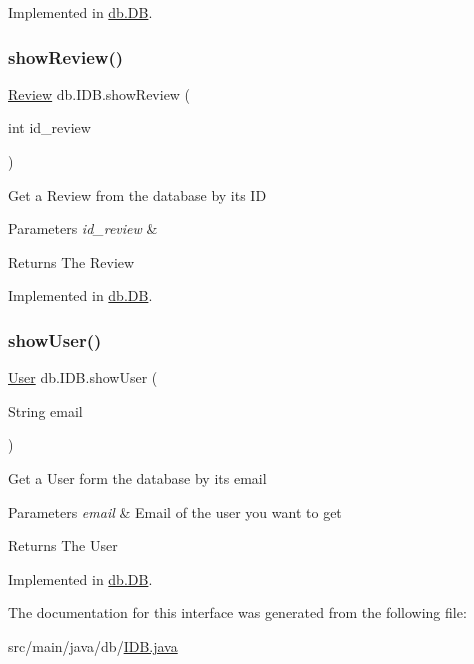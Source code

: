 Implemented in \hyperlink{classdb_1_1_d_b_a22a4c5b98facd4506b03828697220773}{db.\+DB}.

\mbox{\label{interfacedb_1_1_i_d_b_a6c44c3135f07ec6dbef84ecc6fe4f90f}} 
\subsubsection{\texorpdfstring{show\+Review()}{showReview()}}
{\footnotesize\ttfamily \hyperlink{classserver_1_1data_1_1_review}{Review} db.\+I\+D\+B.\+show\+Review (\begin{DoxyParamCaption}\item[{int}]{id\+\_\+review }\end{DoxyParamCaption})}

Get a Review from the database by its ID 
\begin{DoxyParams}{Parameters}
{\em id\+\_\+review} & \\
\hline
\end{DoxyParams}
\begin{DoxyReturn}{Returns}
The Review 
\end{DoxyReturn}


Implemented in \hyperlink{classdb_1_1_d_b_a84b36a9e2c155b1aa2868844cd157df7}{db.\+DB}.

\mbox{\label{interfacedb_1_1_i_d_b_a8dca82226b1c27ceb4b765259546513d}} 
\subsubsection{\texorpdfstring{show\+User()}{showUser()}}
{\footnotesize\ttfamily \hyperlink{classserver_1_1data_1_1_user}{User} db.\+I\+D\+B.\+show\+User (\begin{DoxyParamCaption}\item[{String}]{email }\end{DoxyParamCaption})}

Get a User form the database by its email 
\begin{DoxyParams}{Parameters}
{\em email} & Email of the user you want to get \\
\hline
\end{DoxyParams}
\begin{DoxyReturn}{Returns}
The User 
\end{DoxyReturn}


Implemented in \hyperlink{classdb_1_1_d_b_a914986669ac622ef33ae344baaefa32c}{db.\+DB}.



The documentation for this interface was generated from the following file\+:\begin{DoxyCompactItemize}
\item 
src/main/java/db/\hyperlink{_i_d_b_8java}{I\+D\+B.\+java}\end{DoxyCompactItemize}
